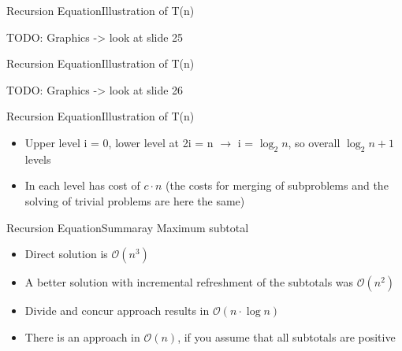 
\begin{frame}{Recursion Equation}{Illustration of T(n)}

TODO: Graphics -> look at slide 25 \vspace{2em}

\end{frame}


\begin{frame}{Recursion Equation}{Illustration of T(n)}

TODO: Graphics -> look at slide 26 \vspace{2em}

\end{frame}


\begin{frame}{Recursion Equation}{Illustration of T(n)}
  \begin{itemize}
    \item
      Upper level i = 0, lower level at 2i = n $\rightarrow$ i = $\log_2 
      n$, so 
      overall $\log_2 n + 1$ levels
    \item
      In each level has cost of $c \cdot n$ (the costs for merging of 
      subproblems and the solving of trivial problems are here the same)
  \end{itemize}
\end{frame}


\begin{frame}{Recursion Equation}{Summaray Maximum subtotal}
  \begin{itemize}
    \item
      Direct solution is $\mathcal{O}(n^3)$
    \item
      A better solution with incremental refreshment of the subtotals was 
      $\mathcal{O}(n^2)$
    \item
      Divide and concur approach results in $\mathcal{O}(n \cdot \log n)$
    \item
      There is an approach in $\mathcal{O}(n)$, if you assume that all 
      subtotals are positive
  \end{itemize}
\end{frame}